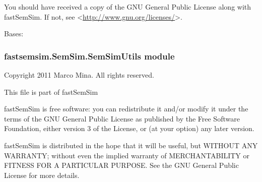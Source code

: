 \documentclass[letterpaper,10pt,english]{sphinxmanual}
\begin{document}
You should have received a copy of the GNU General Public License
along with fastSemSim.  If not, see \textless{}\href{http://www.gnu.org/licenses/}{http://www.gnu.org/licenses/}\textgreater{}.

\begin{fulllineitems}
\label{fastsemsim.SemSim:fastsemsim.SemSim.ResnikSemSim.ResnikSemSim}
Bases: {\hyperref[fastsemsim.SemSim:fastsemsim.SemSim.TermSemSim.TermSemSim]{}}

\begin{fulllineitems}
\label{fastsemsim.SemSim:fastsemsim.SemSim.ResnikSemSim.ResnikSemSim.IC_based}
\end{fulllineitems}


\begin{fulllineitems}
\label{fastsemsim.SemSim:fastsemsim.SemSim.ResnikSemSim.ResnikSemSim.SS_type}
\end{fulllineitems}


\end{fulllineitems}



\subsubsection{fastsemsim.SemSim.SemSimUtils module}
\label{fastsemsim.SemSim:module-fastsemsim.SemSim.SemSimUtils}\label{fastsemsim.SemSim:fastsemsim-semsim-semsimutils-module}
Copyright 2011 Marco Mina. All rights reserved.

This file is part of fastSemSim

fastSemSim is free software: you can redistribute it and/or modify
it under the terms of the GNU General Public License as published by
the Free Software Foundation, either version 3 of the License, or
(at your option) any later version.

fastSemSim is distributed in the hope that it will be useful,
but WITHOUT ANY WARRANTY; without even the implied warranty of
MERCHANTABILITY or FITNESS FOR A PARTICULAR PURPOSE.  See the
GNU General Public License for more details.
\end{document}
